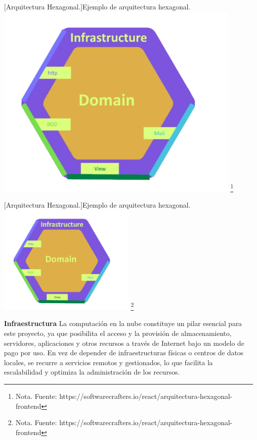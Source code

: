 \begin{itemize}
    \vspace{2mm}
    \begin{minipage}{0.9\textwidth}
        \centering
        [{Arquitectura Hexagonal.}]{Ejemplo de arquitectura hexagonal.}
        \label{hexagonal}
        \includegraphics[width=0.9\textwidth]{Content/Images/hexagonal.png}
        \footnote{Nota. \textup{Fuente: https://softwarecrafters.io/react/arquitectura-hexagonal-frontend}}
    \end{minipage}
\vspace{2mm}
\begin{minipage}{0.9\textwidth}
    \centering
    [{Arquitectura Hexagonal.}]{Ejemplo de arquitectura hexagonal.}
    \label{hexagonal}
    \includegraphics[width=0.5\textwidth]{Content/Images/hexagonal.png}
    \footnote{Nota. \textup{Fuente: https://softwarecrafters.io/react/arquitectura-hexagonal-frontend}}
\end{minipage}
    
\end{itemize}
\textbf{Infraestructura}
\newline
La computación en la nube constituye un pilar esencial para este proyecto, ya que posibilita el acceso y la provisión de almacenamiento, servidores, aplicaciones y otros recursos a través de Internet bajo un modelo de pago por uso. En vez de depender de infraestructuras físicas o centros de datos locales, se recurre a servicios remotos y gestionados, lo que facilita la escalabilidad y optimiza la administración de los recursos.

